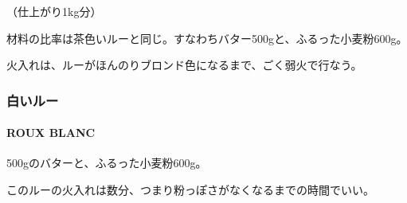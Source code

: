 \begin{recette}

（仕上がり1kg分）

材料の比率は茶色いルーと同じ。すなわちバター500gと、ふるった小麦粉600g。

火入れは、ルーがほんのりブロンド色になるまで、ごく弱火で行なう。

\maeaki

\hypertarget{ux767dux3044ux30ebux30fc}{%
\subsubsection{白いルー}\label{ux767dux3044ux30ebux30fc}}

\hypertarget{roux-blanc}{%
\paragraph{ROUX BLANC}\label{roux-blanc}}


500gのバターと、ふるった小麦粉600g。

このルーの火入れは数分、つまり粉っぽさがなくなるまでの時間でいい。
\end{recette}